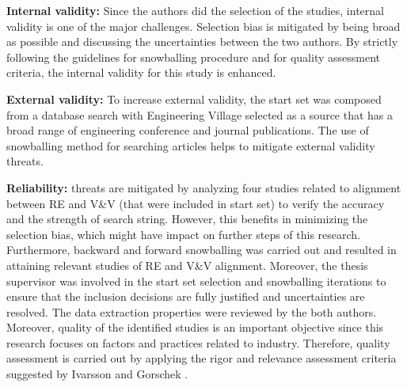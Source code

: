 \documentclass{article}
\begin{document}
\textbf{Internal validity:} Since the authors did the selection of the studies, internal validity is one of the major challenges. Selection bias is mitigated by being broad as possible and discussing the uncertainties between the two authors. By strictly following the guidelines for snowballing procedure and for quality assessment criteria, the internal validity for this study is enhanced. 

\textbf{External validity:} To increase external validity, the start set was composed from a database search with Engineering Village selected as a source that has a broad range of engineering conference and journal publications. The use of snowballing method for searching articles helps to mitigate external validity threats. 

\textbf{Reliability:} threats are mitigated by analyzing four studies related to alignment between RE and V\&V (that were included in start set) to verify the accuracy and the strength of search string. However, this benefits in minimizing the selection bias, which might have impact on further steps of this research.  Furthermore, backward and forward snowballing was carried out and resulted in attaining relevant studies of RE and V\&V alignment. Moreover, the thesis supervisor was involved in the start set selection and snowballing iterations to ensure that the inclusion decisions are fully justified and uncertainties are resolved.
The data extraction properties were reviewed by the both authors. Moreover, quality of the identified studies is an important objective since this research focuses on factors and practices related to industry. Therefore, quality assessment is carried out by applying the rigor and relevance assessment criteria suggested by Ivarsson and Gorschek \cite{ivarsson2011method}. 
\end{document}
